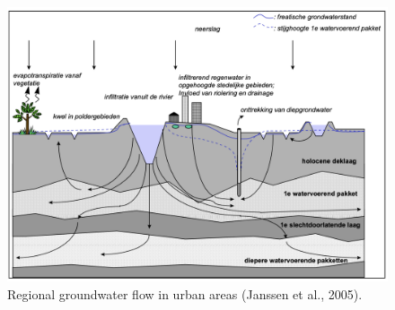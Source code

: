 \begin{figure}[htbp]
    \centering
    \includegraphics[width=0.95\linewidth]{figures/figures theory/Janssen et al.png}
    \caption{Regional groundwater flow in urban areas (Janssen et al., 2005).}
    \label{gwflow}
\end{figure}
\\
